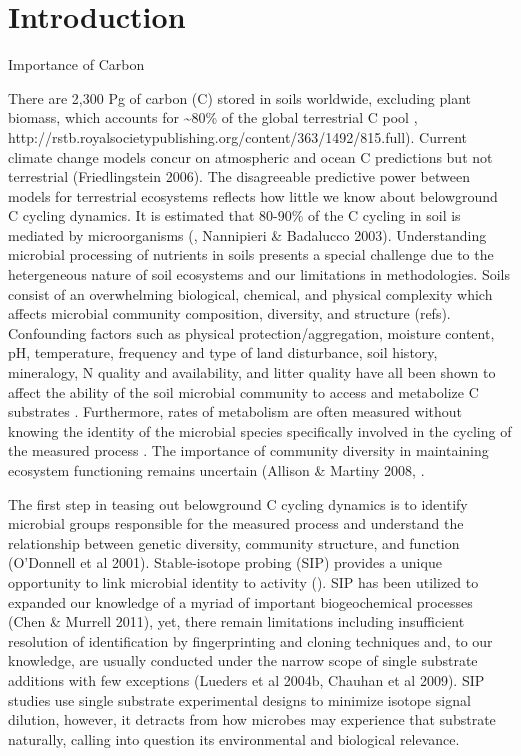 \section{Introduction}

Importance of Carbon 

There are 2,300 Pg of carbon (C) stored in soils worldwide, excluding plant biomass, which accounts for \sim 80\% of the global terrestrial C pool \cite{Amundson_2001,IPCC 2000,IPCC 2007,elsen_Ayres_Wall_Bardgett_2011,Lal_2008,BATJES_1996}, http://rstb.royalsocietypublishing.org/content/363/1492/815.full).  Current climate change models concur on atmospheric and ocean C predictions but not terrestrial (Friedlingstein 2006).  The disagreeable predictive power between models for terrestrial ecosystems reflects how little we know about belowground C cycling dynamics. It is estimated that 80-90\% of the C cycling in soil is mediated by microorganisms (\cite{ColemanCrossley_1996}, Nannipieri & Badalucco 2003). Understanding microbial processing of nutrients in soils presents a special challenge due to the hetergeneous nature of soil ecosystems and our limitations in methodologies. Soils consist of an overwhelming biological, chemical, and physical complexity which affects microbial community composition, diversity, and structure (refs).  Confounding factors such as physical protection/aggregation, moisture content, pH, temperature, frequency and type of land disturbance, soil history, mineralogy, N quality and availability, and litter quality have all been shown to affect the ability of the soil microbial community to access and metabolize C substrates \cite{Schlesinger_1977,dgett_Wall_Hattenschwiler_2010,Sollins_Homann_Caldwell_1996,Torn_Vitousek_Trumbore_2005,TRUMBORE_2006}. Furthermore, rates of metabolism are often measured without knowing the identity of the microbial species specifically involved in the cycling of the measured process \cite{ndi_Pietramellara_Renella_2003}.  The importance of community diversity in maintaining ecosystem functioning remains uncertain (Allison & Martiny 2008, \cite{ndi_Pietramellara_Renella_2003}. 

The first step in teasing out belowground C cycling dynamics is to identify microbial groups responsible for the measured process and understand the relationship between genetic diversity, community structure, and function (O’Donnell et al 2001). Stable-isotope probing (SIP) provides a unique opportunity to link microbial identity to activity (\cite{Chen_Murrell_2010}). SIP has been utilized to expanded our knowledge of a myriad of important biogeochemical processes (Chen & Murrell 2011), yet, there remain limitations including insufficient resolution of identification by fingerprinting and cloning techniques and, to our knowledge, are usually conducted under the narrow scope of single substrate additions with few exceptions (Lueders et al 2004b, Chauhan et al 2009). SIP studies use single substrate experimental designs to minimize isotope signal dilution, however, it detracts from how microbes may experience that substrate naturally, calling into question its environmental and biological relevance.

